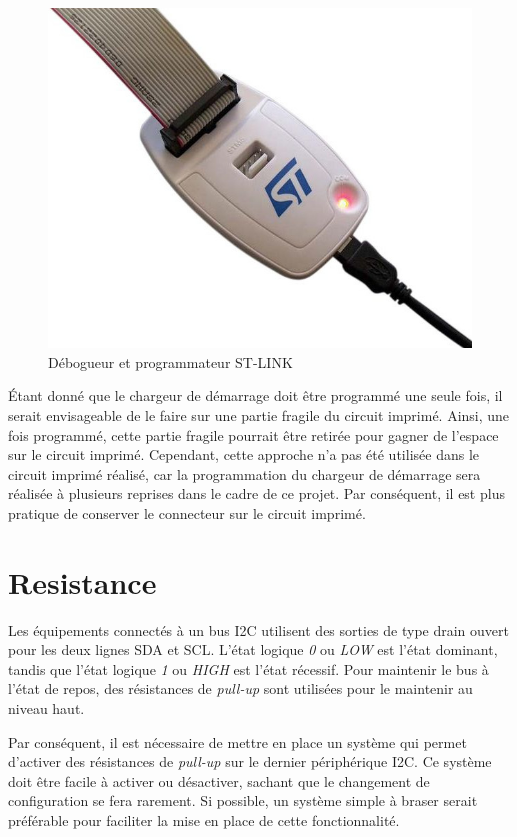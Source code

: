 \begin{figure}[H]
    \centering
    \includegraphics[scale=0.3]{./assets/figures/st_link.jpg}
    \caption{\cite{st_link} Débogueur et programmateur ST-LINK}
\end{figure}

Étant donné que le chargeur de démarrage doit être programmé une seule fois, il serait envisageable de le faire sur une partie fragile du circuit imprimé.
Ainsi, une fois programmé, cette partie fragile pourrait être retirée pour gagner de l'espace sur le circuit imprimé.
Cependant, cette approche n'a pas été utilisée dans le circuit imprimé réalisé, car la programmation du chargeur de démarrage sera réalisée à plusieurs reprises dans le cadre de ce projet.
Par conséquent, il est plus pratique de conserver le connecteur sur le circuit imprimé.

\section{Resistance}

Les équipements connectés à un bus I2C utilisent des sorties de type drain ouvert pour les deux lignes SDA et SCL.
L'état logique \textit{0} ou \textit{LOW} est l'état dominant, tandis que l'état logique \textit{1} ou \textit{HIGH} est l'état récessif.
Pour maintenir le bus à l'état de repos, des résistances de \textit{pull-up} sont utilisées pour le maintenir au niveau haut.

Par conséquent, il est nécessaire de mettre en place un système qui permet d'activer des résistances de \textit{pull-up} sur le dernier périphérique I2C.
Ce système doit être facile à activer ou désactiver, sachant que le changement de configuration se fera rarement.
Si possible, un système simple à braser serait préférable pour faciliter la mise en place de cette fonctionnalité.

